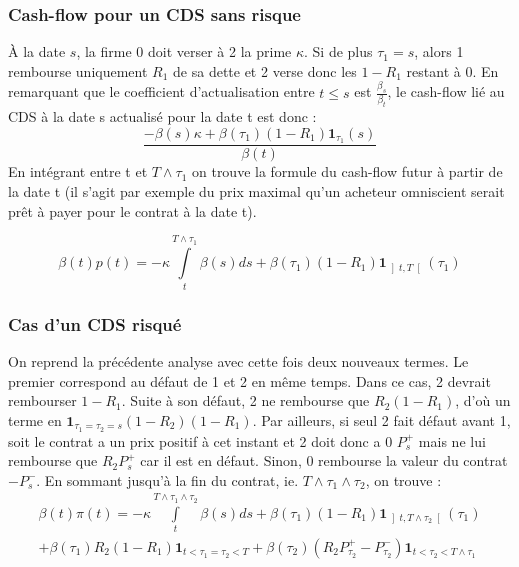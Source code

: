 \documentclass[a4paper]{article}
\begin{document}
\subsubsection{Cash-flow pour un CDS sans risque}
À la date $s$, la firme 0 doit verser à 2 la prime $\kappa$.
 Si de plus $\tau_1 = s$, alors 1 rembourse uniquement $R_1$ de sa dette et 2 verse donc les $1-R_1$ restant à 0.
 En remarquant que le coefficient d'actualisation entre $t\leq s$ est $\frac{\beta_{s}}{\beta_{t}}$, le cash-flow lié au CDS à la date s actualisé pour la date t est donc : 
\begin{equation*}
\frac{- \beta(s) \kappa+ \beta(\tau_{1}) \left( 1 - R_{1} \right)  \mathbf{ 1 }_{\tau_{1} } \left( s \right) }{\beta (t)} 
\end{equation*}
En intégrant entre t et $T \wedge \tau_{1}$ on trouve la formule du cash-flow futur à partir de la date t (il s'agit par exemple du prix maximal qu'un acheteur omniscient serait prêt à payer pour le contrat à la date t).

\begin{equation}
\beta (t) p(t) = -\kappa \int\limits_{t}^{T \wedge \tau_{1}} \beta(s)ds + \beta(\tau_{1})\left( 1 - R_{1} \right)\mathbf{ 1 }_{\left] t, T \right[}(\tau_{1})
\end{equation}
\subsubsection{Cas d'un CDS risqué}
On reprend la précédente analyse avec cette fois deux nouveaux termes.
 Le premier correspond au défaut de 1 et 2 en même temps.
 Dans ce cas, 2 devrait rembourser $1-R_{1}$.
 Suite à son défaut, 2 ne rembourse que $R_{2}(1-R_{1})$, d'où un terme en $\mathbf{1}_{\tau_{1} = \tau_{2} = s} (1-R_{2})(1-R_{1})$.
 Par ailleurs, si seul 2 fait défaut avant 1, soit le contrat a un prix positif à cet instant et 2 doit donc a 0 $P_{s}^{+}$ mais ne lui rembourse que $R_{2}P_{s}^{+}$ car il est en défaut.
 Sinon, 0 rembourse la valeur du contrat $-P_{s}^{-}$.
 En sommant jusqu'à la fin du contrat, ie.
 $T \wedge \tau_{1} \wedge \tau_{2}$, on trouve :
\begin{multline}
\beta(t)\pi(t) = -\kappa \int\limits_{t}^{T \wedge \tau_{1} \wedge \tau_{2}} \beta(s)ds + \beta\left(\tau_{1}\right)\left( 1 - R_{1} \right)\mathbf{ 1 }_{\left] t, T \wedge \tau_{2} \right[}(\tau_{1}) \\
+ \beta(\tau_{1}) R_{2} \left( 1 - R_{1} \right) \mathbf{1}_{t < \tau_{1} = \tau_{2} < T} 
+ \beta(\tau_{2}) \left( R_{2}P_{\tau_{2}}^{+} - P_{\tau_{2}}^{-} \right) \mathbf{1}_{t < \tau_{2} < T \wedge \tau_{1}}
\end{multline}
\pagebreak
\end{document}

